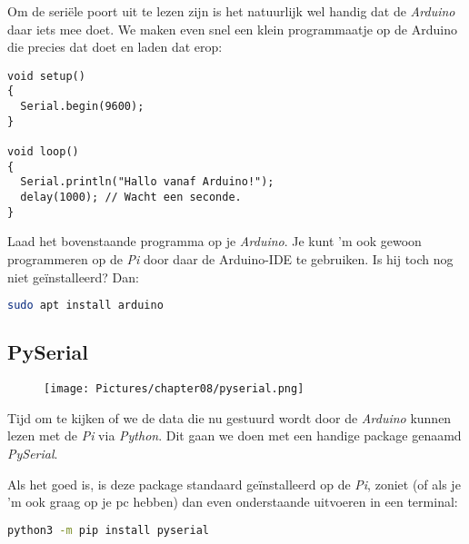 Om de seriële poort uit te lezen zijn is het natuurlijk wel handig dat de \textit{Arduino} daar iets mee doet. We maken even snel een klein programmaatje op de Arduino die precies dat doet en laden dat erop:
\begin{lstlisting}[language=Arduino]
void setup() 
{
  Serial.begin(9600);
}

void loop() 
{
  Serial.println("Hallo vanaf Arduino!");
  delay(1000); // Wacht een seconde.
}
\end{lstlisting}
\begin{exercise}
  Laad het bovenstaande programma op je \textit{Arduino}. Je kunt 'm ook gewoon programmeren op de \textit{Pi} door daar de Arduino-IDE te gebruiken. Is hij toch nog niet geïnstalleerd? Dan:
  \begin{lstlisting}[language=bash]
  sudo apt install arduino
  \end{lstlisting}
\end{exercise}

\subsection{PySerial}

\begin{figure}[h!]
\centering\texttt{[image: Pictures/chapter08/pyserial.png]}
\label{fig:pyserial} %
\end{figure}

Tijd om te kijken of we de data die nu gestuurd wordt door de \textit{Arduino} kunnen lezen met de \textit{Pi} via \textit{Python}. Dit gaan we doen met een handige package genaamd \textit{PySerial}. 

\begin{remark}
  Als het goed is, is deze package standaard geïnstalleerd op de \textit{Pi}, zoniet (of als je 'm ook graag op je pc hebben) dan even onderstaande uitvoeren in een terminal:
  \begin{lstlisting}[language=bash]
    python3 -m pip install pyserial
  \end{lstlisting}
\end{remark}


